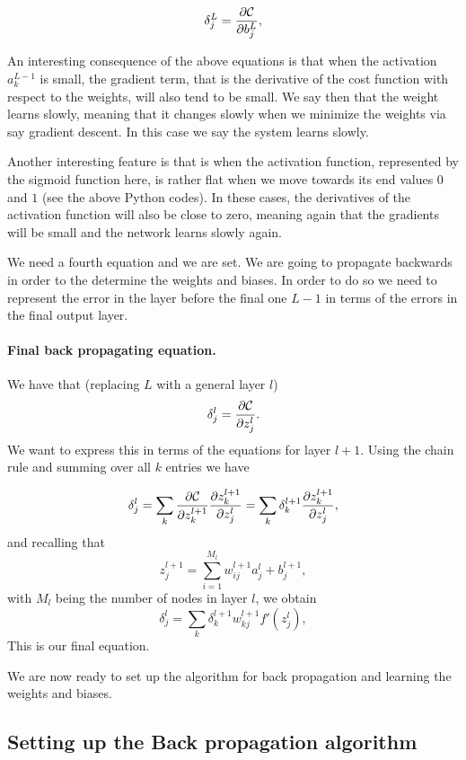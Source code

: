 \documentclass[%
oneside,                 %
final,                   %
10pt]{article}
\begin{document}
\begin{equation}
\delta_j^L = \frac{\partial {\cal C}}{\partial b_j^L},
\end{equation}




An interesting consequence of the above equations is that when the
activation $a_k^{L-1}$ is small, the gradient term, that is the
derivative of the cost function with respect to the weights, will also
tend to be small. We say then that the weight learns slowly, meaning
that it changes slowly when we minimize the weights via say gradient
descent. In this case we say the system learns slowly.

Another interesting feature is that is when the activation function,
represented by the sigmoid function here, is rather flat when we move towards
its end values $0$ and $1$ (see the above Python codes). In these
cases, the derivatives of the activation function will also be close
to zero, meaning again that the gradients will be small and the
network learns slowly again.



We need a fourth equation and we are set. We are going to propagate
backwards in order to the determine the weights and biases. In order
to do so we need to represent the error in the layer before the final
one $L-1$ in terms of the errors in the final output layer.


\paragraph{Final back propagating equation.}
We have that (replacing $L$ with a general layer $l$)
\[
\delta_j^l =\frac{\partial {\cal C}}{\partial z_j^l}.
\]
We want to express this in terms of the equations for layer $l+1$. Using the chain rule and summing over all $k$ entries we have

\[
\delta_j^l =\sum_k \frac{\partial {\cal C}}{\partial z_k^{l+1}}\frac{\partial z_k^{l+1}}{\partial z_j^{l}}=\sum_k \delta_k^{l+1}\frac{\partial z_k^{l+1}}{\partial z_j^{l}},
\]
and recalling that
\[
z_j^{l+1} = \sum_{i=1}^{M_{l}}w_{ij}^{l+1}a_j^{l}+b_j^{l+1},
\]
with $M_l$ being the number of nodes in layer $l$, we obtain
\[
\delta_j^l =\sum_k \delta_k^{l+1}w_{kj}^{l+1}f'(z_j^l),
\]
This is our final equation.

We are now ready to set up the algorithm for back propagation and learning the weights and biases.

\subsection{Setting up the Back propagation algorithm}
\end{document}

